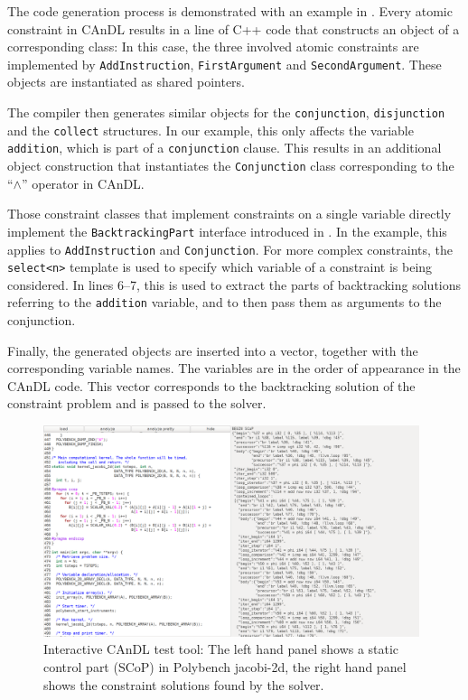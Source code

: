    The code generation process is demonstrated with an example in
    .
    Every atomic constraint in CAnDL results in a line of C++ code that
    constructs an object of a corresponding class:
    In this case, the three involved atomic constraints are implemented by
    \texttt{AddInstruction}, \texttt{FirstArgument} and \texttt{SecondArgument}.
    These objects are instantiated as shared pointers.

    The compiler then generates similar objects for the
    \texttt{conjunction}, \texttt{disjunction} and the \texttt{collect} structures.
    In our example, this only affects the variable \texttt{addition}, which is
    part of a \texttt{conjunction} clause.
    This results in an additional object construction that instantiates the
    \texttt{Conjunction} class corresponding to the ``$\land$'' operator
    in CAnDL.

    Those constraint classes that implement constraints on a single variable
    directly implement the \texttt{BacktrackingPart} interface introduced in
    .
    In the example, this applies to \texttt{AddInstruction} and
    \texttt{Conjunction}.
    For more complex constraints, the \texttt{select<n>} template is used to
    specify which variable of a constraint is being considered.
    In lines 6--7, this is used to extract the parts of backtracking solutions
    referring to the \texttt{addition} variable, and to then pass them as
    arguments to the conjunction.

    Finally, the generated objects are inserted into a vector, together with the
    corresponding variable names.
    The variables are in the order of appearance in the CAnDL code.
    This vector corresponds to the backtracking solution of the constraint
    problem and is passed to the solver.

\begin{figure}[ht]
\centering
\includegraphics[width=0.98\textwidth]{figures/visual_gui2.png}
\caption{Interactive CAnDL test tool: The left hand panel shows a static control
        part (SCoP) in Polybench jacobi-2d, the right hand panel shows the
        constraint solutions found by the solver.
        \parfillskip=0pt}
\label{fig:gui}
\end{figure}

